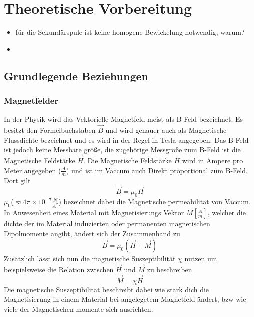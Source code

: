 \section{Theoretische Vorbereitung}
    \begin{itemize}
        \item für die Sekundärspule ist keine homogene Bewickelung notwendig, warum?
        \item 
    \end{itemize}
    \subsection{Grundlegende Beziehungen}
        \subsubsection{Magnetfelder}
            In der Physik wird das Vektorielle Magnetfeld meist als B-Feld bezeichnet. Es besitzt den Formelbuchstaben
            $\vec{B}$ und wird genauer auch als Magnetische Flussdichte bezeichnet und es wird in der Regel in Tesla angegeben.
            Das B-Feld ist jedoch keine Messbare größe, die zugehörige Messgröße zum B-Feld ist die Magnetische Feldstärke $\vec{H}$.
            Die Magnetische Feldstärke $H$ wird in Ampere pro Meter angegeben ($\frac{A}{m}$) und ist im Vaccum auch Direkt proportional
            zum B-Feld. Dort gilt
            \begin{equation}
                \vec{B} = \mu_0 \vec{H}
            \end{equation}
            $\mu_0$($\eqsim 4\pi ×10^{-7 }\frac{N}{A^2}$) bezeichnet dabei die Magnetische permeabilität von Vaccum.
            In Anwesenheit eines Material mit Magnetisierungs Vektor $M [\frac{A}{m}]$, welcher die dichte der im Material induzierten oder permanenten magnetischen Dipolmomente angibt, ändert sich der Zusammenhand zu
            \begin{equation}
                \vec{B} = \mu_0 (\vec{H} + \vec{M})
            \end{equation}
            Zusätzlich lässt sich nun die magnetische Suszeptibilität $\chi$ nutzen um beispielsweise die Relation zwischen $\vec{H}$ und $\vec{M}$ zu beschreiben
            \begin{equation}
                \vec{M} = \chi \vec{H}
            \end{equation}
            Die magnetische Suszeptibilität beschreibt dabei wie stark dich die Magnetisierung in einem
            Material bei angelegetem Magnetfeld ändert, bzw wie viele der Magnetischen momente sich ausrichten.
